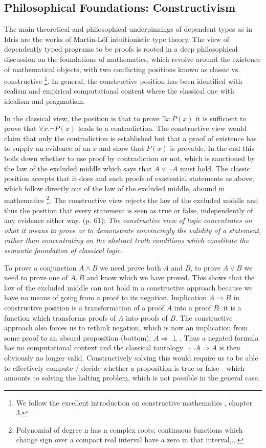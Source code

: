 \subsection{Philosophical Foundations: Constructivism}
\label{sub:dep_foundations}

The main theoretical and philosophical underpinnings of dependent types as in Idris are the works of Martin-L\"of intuitionistic type theory. The view of dependently typed programs to be proofs is rooted in a deep philosophical discussion on the foundations of mathematics, which revolve around the existence of mathematical objects, with two conflicting positions known as classic vs. constructive \footnote{We follow the excellent introduction on constructive mathematics \cite{thompson_type_1991}, chapter 3.}. In general, the constructive position has been identified with realism and empirical computational content where the classical one with idealism and pragmatism.

In the classical view, the position is that to prove $\exists x. P(x)$ it is sufficient to prove that $\forall x. \neg P(x)$ leads to a contradiction. The constructive view would claim that only the contradiction is established but that a proof of existence has to supply an evidence of an $x$ and show that $P(x)$ is provable. In the end this boils down whether to use proof by contradiction or not, which is sanctioned by the law of the excluded middle which says that $A \lor \neg A$ must hold. The classic position accepts that it does and such proofs of existential statements as above, which follow directly out of the law of the excluded middle, abound in mathematics \footnote{Polynomial of degree n has n complex roots; continuous functions which change sign over a compact real interval have a zero in that interval,...}. The constructive view rejects the law of the excluded middle and thus the position that every statement is seen as true or false, independently of any evidence either way. \cite{thompson_type_1991} (p. 61): \textit{The constructive view of logic concentrates on what it means to prove or to demonstrate convincingly the validity of a statement, rather than concentrating on the abstract truth conditions which constitute the semantic foundation of classical logic}.

To prove a conjunction $A \land B$ we need prove both $A$ and $B$, to prove $A \lor B$ we need to prove one of $A, B$ and know which we have proved. This shows that the law of the excluded middle can not hold in a constructive approach because we have no means of going from a proof to its negation. Implication $A \Rightarrow B$ in constructive position is a transformation of a proof $A$ into a proof $B$: it is a function which transforms proofs of $A$ into proofs of $B$. The constructive approach also forces us to rethink negation, which is now an implication from some proof to an absurd proposition (bottom): $A \Rightarrow \perp$. Thus a negated formula has no computational context and the classical tautology $\neg \neg A \Rightarrow A$ is then obviously no longer valid.  Constructively solving this would require us to be able to effectively compute / decide whether a proposition is true or false - which amounts to solving the halting problem, which is not possible in the general case.

